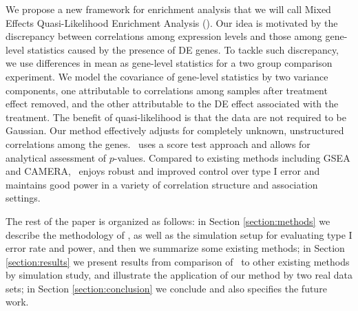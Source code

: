 	We propose a new framework for enrichment analysis that we will call Mixed Effects 
	Quasi-Likelihood
	Enrichment Analysis (\OurMethod). Our idea is motivated by the discrepancy between correlations
	among expression levels and those among gene-level statistics caused by the presence of DE 
	genes.
	To tackle such discrepancy, we use differences in mean as gene-level statistics for a two group
	comparison experiment. We model the covariance of gene-level statistics by two variance 
	components,
	one attributable to correlations among samples after treatment effect removed, and the other
	attributable to the DE effect associated with the treatment. The benefit of quasi-likelihood is 
	that
	the data are not required to be Gaussian. Our method effectively adjusts for completely unknown,
	unstructured correlations among the genes. \OurMethod~uses a score test approach and allows for
	analytical assessment of $p$-values. Compared to existing methods including GSEA and CAMERA,
	\OurMethod~enjoys robust and improved control over type I error and maintains good power in a
	variety of correlation structure and association settings. 
	
	The rest of the paper is organized as follows: in Section \ref{section:methods} we describe the
	methodology of 
	\OurMethod, as well as the simulation setup for evaluating type I error rate and power, and 
	then we summarize some existing methods; in
	Section \ref{section:results} we present results from comparison of \OurMethod~to other existing
	methods by simulation study, and illustrate the application of our method by two real data 
	sets; in
	Section \ref{section:conclusion} we conclude and also specifies the future work.
	
	
	
